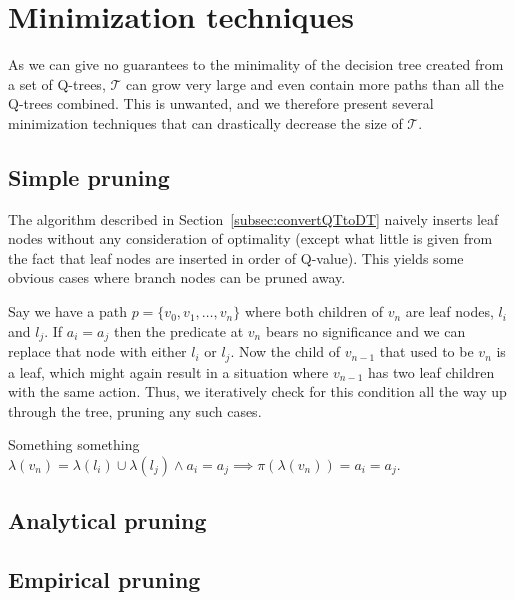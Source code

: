 \section{Minimization techniques}%
\label{sec:minimization}

As we can give no guarantees to the minimality of the decision tree created from
a set of Q-trees, $\mathcal{T}$ can grow very large and even contain more paths
than all the Q-trees combined. This is unwanted, and we therefore present
several minimization techniques that can drastically decrease the size of
$\mathcal{T}$.

\subsection{Simple pruning}%
\label{sub:simplePrune}


The algorithm described in Section~\ref{subsec:convertQTtoDT} naively inserts
leaf nodes without any consideration of optimality (except what little is given
from the fact that leaf nodes are inserted in order of Q-value). This yields
some obvious cases where branch nodes can be pruned away.

Say we have a path $p = \{v_0, v_1, \dots, v_n \}$ where both children of $v_n$ 
are leaf nodes, $l_i$ and $l_j$. If $a_i = a_j$ then the predicate at $v_n$
bears no significance and we can replace that node with either $l_i$ or $l_j$.
Now the child of $v_{n-1}$ that used to be $v_n$ is a leaf, which might again
result in a situation where $v_{n-1}$ has two leaf children with the same
action. Thus, we iteratively check for this condition all the way up through the
tree, pruning any such cases.

Something something $\lambda(v_n) = \lambda(l_i) \cup \lambda(l_j) \land a_i =
a_j \implies \pi(\lambda(v_n)) = a_i = a_j$.

\subsection{Analytical pruning}%
\label{sub:anaPrune}

\lipsum[1]


\subsection{Empirical pruning}%
\label{sub:empPrune}

